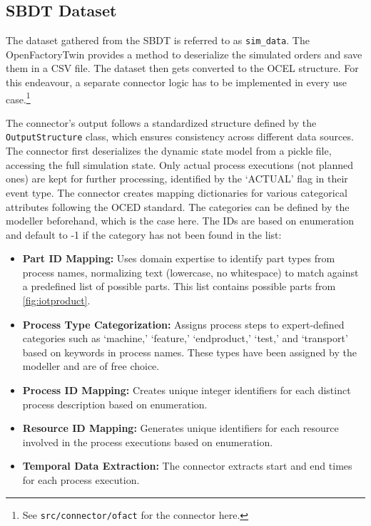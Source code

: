 \subsection*{SBDT Dataset}

The dataset gathered from the SBDT is referred to as \texttt{sim\_data}. The OpenFactoryTwin provides a method to deserialize the simulated orders and save them in a CSV file. The dataset then gets converted to the OCEL structure. For this endeavour, a separate connector logic has to be implemented in every use case.\footnote{See \texttt{src/connector/ofact} for the connector here.}

The connector's output follows a standardized structure defined by the \texttt{OutputStructure} class, which ensures consistency across different data sources. The connector first deserializes the dynamic state model from a pickle file, accessing the full simulation state. Only actual process executions (not planned ones) are kept for further processing, identified by the `ACTUAL' flag in their event type. The connector creates mapping dictionaries for various categorical attributes following the OCED standard. The categories can be defined by the modeller beforehand, which is the case here. The IDs are based on enumeration and default to -1 if the category has not been found in the list:

\begin{itemize}
    \item \textbf{Part ID Mapping:} Uses domain expertise to identify part types from process names, normalizing text (lowercase, no whitespace) to match against a predefined list of possible parts. This list contains possible parts from \autoref{fig:iotproduct}.
    \item \textbf{Process Type Categorization:} Assigns process steps to expert-defined categories such as `machine,' `feature,' `endproduct,' `test,' and `transport' based on keywords in process names. These types have been assigned by the modeller and are of free choice.
    \item \textbf{Process ID Mapping:} Creates unique integer identifiers for each distinct process description based on enumeration.
    \item \textbf{Resource ID Mapping:} Generates unique identifiers for each resource involved in the process executions based on enumeration.
    \item \textbf{Temporal Data Extraction:} The connector extracts start and end times for each process execution.
\end{itemize}

